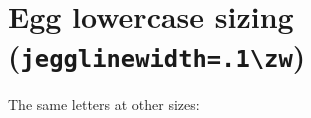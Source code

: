\documentclass{jlreq}
\begin{document}
\section*{Egg lowercase sizing (\texttt{jegglinewidth=.1\textbackslash zw})}

\KKSeggsuite
{\small\KKSeggsuite}%
{\Large\KKSeggsuite}%
{\Huge\KKSeggsuite}%

\KKSeggshowcase

\medskip
\noindent The same letters at other sizes:\par
{\small{}}\quad
{\Large{}}\quad
{\Huge{}}
\end{document}
